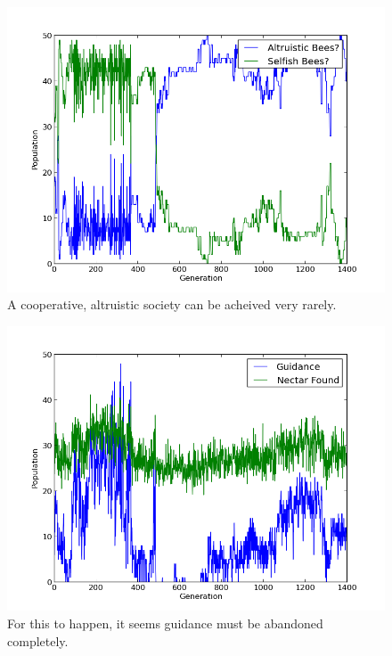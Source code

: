 \documentclass[11pt]{article}
\begin{document}
			\begin{figure}[tb]
				\begin{center}
					\includegraphics[scale=.75]{results/gossip_alt_comp.png}
				\end{center}
				\caption{A cooperative, altruistic society can be acheived very rarely.}
				\label{fig:recurrent_reserves}
			\end{figure}

                        \begin{figure}[tb]
				\begin{center}
					\includegraphics[scale=.75]{results/gossip_alt_tell.png}
				\end{center}
                \caption{For this to happen, it seems guidance must be abandoned completely.}
				\label{fig:recurrent_composition}
			\end{figure}
\end{document}
